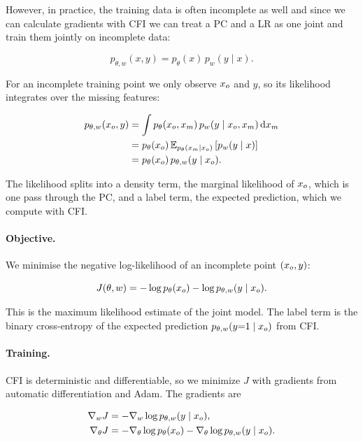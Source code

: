 However, in practice, the training data is often incomplete as well and since we can calculate gradients with CFI we can 
treat a PC and a LR as one joint and train them jointly on incomplete data:

\[
  p_{\theta, w}(x, y) = p_\theta(x)\, p_w(y \mid x).
\]

For an incomplete training point we only observe $x_o$ and $y$, so its likelihood integrates over the missing features:

\begin{align*}
  p_{\theta, w}(x_o, y) &= \int p_\theta(x_o, x_m)\, p_w(y \mid x_o, x_m) \, \mathrm{d}x_m \\
  &= p_\theta(x_o)\, \mathbb{E}_{p_\theta(x_m \mid x_o)} \left[ p_w(y \mid x) \right] \\
  &= p_\theta(x_o)\, p_{\theta, w}(y \mid x_o).
\end{align*}

The likelihood splits into a density term, the marginal likelihood of $x_o$, which is one pass through the PC,
and a label term, the expected prediction, which we compute with CFI.

\paragraph{Objective.}
We minimise the negative log-likelihood of an incomplete point $(x_o, y)$:

\begin{equation}
  J(\theta, w) = -\log p_\theta(x_o) - \log p_{\theta, w}(y \mid x_o).
  \label{eq:pclr}
\end{equation}

This is the maximum likelihood estimate of the joint model.
The label term is the binary cross-entropy of the expected prediction $p_{\theta, w}(y{=}1 \mid x_o)$ from CFI.

\paragraph{Training.}
CFI is deterministic and differentiable, so we minimize $J$ with gradients from automatic differentiation and Adam.
The gradients are

\begin{align*}
  \nabla_w J &= -\nabla_w \log p_{\theta, w}(y \mid x_o), \\
  \nabla_\theta J &= -\nabla_\theta \log p_\theta(x_o) - \nabla_\theta \log p_{\theta, w}(y \mid x_o).
\end{align*}


